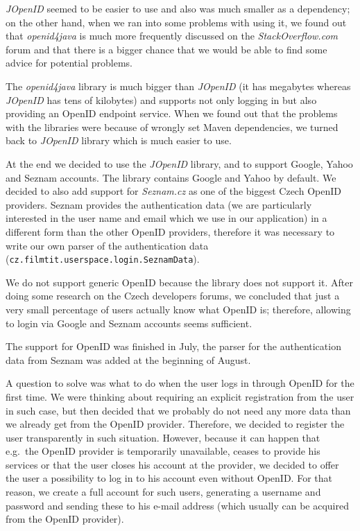 \emph{JOpenID} seemed to be easier to use and also was much smaller as a dependency; on the other hand, when we ran into some problems with using it, we found out that \emph{openid4java} is much more frequently discussed on the \emph{StackOverflow.com} forum and that there is a bigger chance that we would be able to find some advice for potential problems.

The \emph{openid4java} library is much bigger than \emph{JOpenID} (it has megabytes whereas \emph{JOpenID} has tens of kilobytes) and supports not only logging in but also providing an OpenID endpoint service. When we found out that the problems with the libraries were because of wrongly set Maven dependencies, we turned back to \emph{JOpenID} library which is much easier to use.

At the end we decided to use the \emph{JOpenID} library, and to support Google, Yahoo and Seznam accounts. The library contains Google and Yahoo by default. We decided to also add support for \emph{Seznam.cz} as one of the biggest Czech OpenID providers. Seznam provides the authentication data (we are particularly interested in the user name and email which we use in our application) in a different form than the other OpenID providers, therefore it was necessary to write our own parser of the authentication data ({\tt{cz.filmtit.userspace.login.SeznamData}}).

We do not support generic OpenID because the library does not support it. After doing some research on the Czech developers forums, we concluded that just a very small percentage of users actually know what OpenID is; therefore, allowing to login via Google and Seznam accounts seems sufficient.

The support for OpenID was finished in July, the parser for the authentication data from Seznam was added at the beginning of August.

A question to solve was what to do when the user logs in through OpenID for the first time. We were thinking about requiring an explicit registration from the user in such case, but then decided that we probably do not need any more data than we already get from the OpenID provider. Therefore, we decided to register the user transparently in such situation.
However, because it can happen that e.g.\ the OpenID provider is temporarily unavailable, ceases to provide his services or that the user closes his account at the provider, we decided to offer the user a possibility to log in to his account even without OpenID. For that reason, we create a full account for such users, generating a username and password and sending these to his e-mail address (which usually can be acquired from the OpenID provider).

